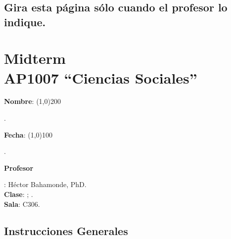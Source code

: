 \documentclass{article}
\begin{document}
\subsection*{Gira esta p\'agina s\'olo cuando el profesor lo indique.}

\clearpage
\newpage

{\centering\section*{Midterm\\AP1007 ``Ciencias Sociales''}}

{\vspace{.5cm}\raggedright{\bf Nombre}: \line(1,0){200}}. %
{\vspace{.5cm}\hspace{4.5cm}\raggedright{\bf Fecha}: \line(1,0){100}}. %


{\vspace{.5cm}\raggedright \bf Profesor}: H\'ector Bahamonde, PhD.\\
{\bf Clase}: {\unskip}; {\unskip}.\\
{\bf Sala}: C306.


\vspace{0.5cm}\subsection*{Instrucciones Generales}
\end{document}
